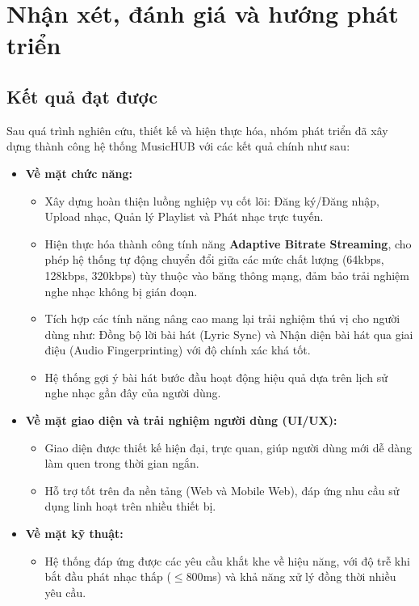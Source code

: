 \documentclass[a4paper]{article}
\newcommand{\cach}{\hspace*{1.5em}\ignorespaces}
\begin{document}






\section{Nhận xét, đánh giá và hướng phát triển}
\subsection{Kết quả đạt được}
\cach Sau quá trình nghiên cứu, thiết kế và hiện thực hóa, nhóm phát triển đã xây dựng thành công hệ thống MusicHUB với các kết quả chính như sau:

\begin{itemize}
    \item \textbf{Về mặt chức năng:}
    \begin{itemize}
        \item Xây dựng hoàn thiện luồng nghiệp vụ cốt lõi: Đăng ký/Đăng nhập, Upload nhạc, Quản lý Playlist và Phát nhạc trực tuyến.
        \item Hiện thực hóa thành công tính năng \textbf{Adaptive Bitrate Streaming}, cho phép hệ thống tự động chuyển đổi giữa các mức chất lượng (64kbps, 128kbps, 320kbps) tùy thuộc vào băng thông mạng, đảm bảo trải nghiệm nghe nhạc không bị gián đoạn.
        \item Tích hợp các tính năng nâng cao mang lại trải nghiệm thú vị cho người dùng như: Đồng bộ lời bài hát (Lyric Sync) và Nhận diện bài hát qua giai điệu (Audio Fingerprinting) với độ chính xác khá tốt.
        \item Hệ thống gợi ý bài hát bước đầu hoạt động hiệu quả dựa trên lịch sử nghe nhạc gần đây của người dùng.
    \end{itemize}

    \item \textbf{Về mặt giao diện và trải nghiệm người dùng (UI/UX):}
    \begin{itemize}
        \item Giao diện được thiết kế hiện đại, trực quan, giúp người dùng mới dễ dàng làm quen trong thời gian ngắn.
        \item Hỗ trợ tốt trên đa nền tảng (Web và Mobile Web), đáp ứng nhu cầu sử dụng linh hoạt trên nhiều thiết bị.
    \end{itemize}

    \item \textbf{Về mặt kỹ thuật:}
    \begin{itemize}
        \item Hệ thống đáp ứng được các yêu cầu khắt khe về hiệu năng, với độ trễ khi bắt đầu phát nhạc thấp ($\leq 800$ms) và khả năng xử lý đồng thời nhiều yêu cầu.
    \end{itemize}
\end{itemize}
\end{document}
